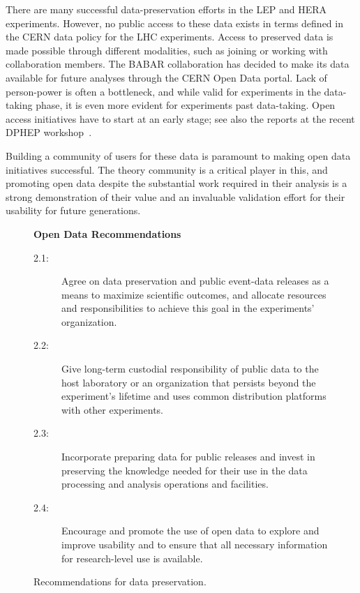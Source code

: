 \documentclass[11pt]{article}
\begin{document}

There are many successful data-preservation efforts in the \gls{LEP} and \gls{HERA} experiments. However, no public access to these data exists in terms defined in the \gls{CERN} data policy for the \gls{LHC} experiments. Access to preserved data is made possible through different modalities, such as joining or working with collaboration members. The \gls{BABAR} collaboration has decided to make its data available for future analyses through the \gls{CERN} Open Data portal. Lack of person-power is often a bottleneck, and while valid for experiments in the data-taking phase, it is even more evident for experiments past data-taking. Open access initiatives have to start at an early stage; see also the reports at the recent DPHEP workshop~\cite{DPHEPws:2021}.

Building a community of users for these data is paramount to making open data initiatives successful. The theory community is a critical player in this, and promoting open data despite the substantial work required in their analysis is a strong demonstration of their value and an invaluable validation effort for their usability for future generations.

\begin{figure}[!ht]
\begin{tcolorbox}
\begin{center}
{\large \textbf{Open Data Recommendations}}
\end{center}
%
\begin{description}
   \item[2.1:] Agree on \gls{data preservation} and public event-data releases as a means to maximize scientific outcomes, and allocate resources and responsibilities to achieve this goal in the experiments' organization.    \item[2.2:] Give long-term custodial responsibility of public \gls{data} to the host laboratory or an organization that persists beyond the experiment's lifetime and uses common distribution platforms with other experiments.
   \item[2.3:] Incorporate preparing \gls{data} for public releases and invest in preserving the knowledge needed for their use in the data processing and analysis operations and facilities.
   \item[2.4:] Encourage and promote the use of open data to explore and improve usability and to ensure that all necessary information for research-level use is available.
\end{description}
\end{tcolorbox}
\caption{Recommendations for data preservation.}
\label{fig:recs_opendata}
\end{figure}
\end{document}
